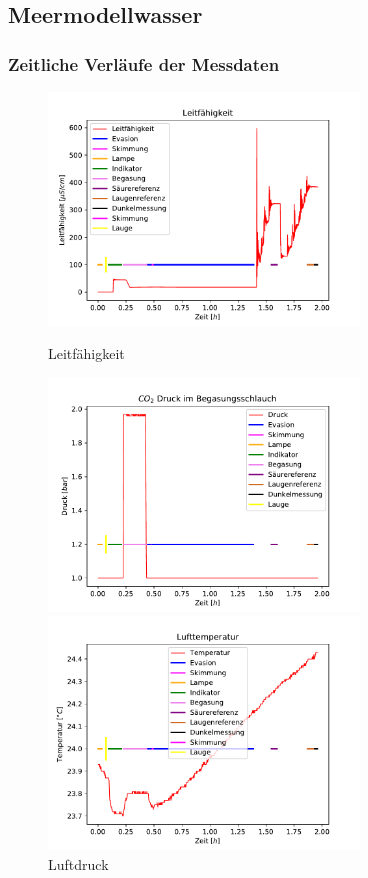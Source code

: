 \documentclass[12pt]{article}
\begin{document}
\subsection{Meermodellwasser}
\subsubsection{Zeitliche Verl\"aufe der Messdaten}

\begin{figure}[H]
	\centering
	\parbox{82.5mm}{
		\centering
		\includegraphics[width=82.5mm]{Meerwasser/Leitfaehigkeit}
		\caption{Leitf\"ahigkeit \label{fig: Meermodellwasser}}
	}
	\hfill%
	\parbox{82.5mm}{
		\centering
		\includegraphics[width=82.5mm]{Meerwasser/Luftdruck}
		\caption{Luftdruck}
	}
	\centering
	\parbox{82.5mm}{
		\centering
		\includegraphics[width=82.5mm]{Meerwasser/Lufttemperatur}
}
\end{figure}
\end{document}
